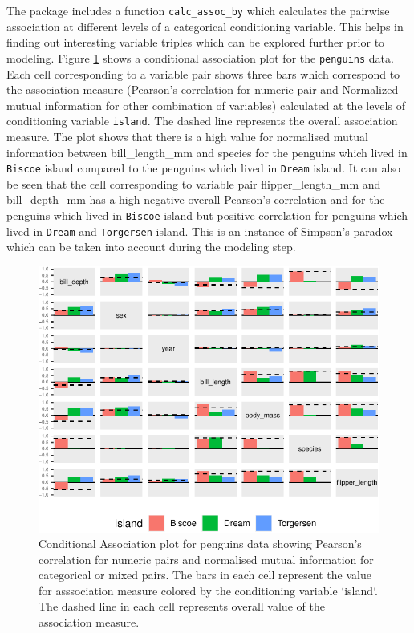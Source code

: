 The package includes a function \texttt{calc\_assoc\_by} which
calculates the pairwise association at different levels of a categorical
conditioning variable. This helps in finding out interesting variable
triples which can be explored further prior to modeling. Figure
\ref{fig:cond-assoc} shows a conditional association plot for the
\texttt{penguins} data. Each cell corresponding to a variable pair shows
three bars which correspond to the association measure (Pearson's
correlation for numeric pair and Normalized mutual information for other
combination of variables) calculated at the levels of conditioning
variable \texttt{island}. The dashed line represents the overall
association measure. The plot shows that there is a high value for
normalised mutual information between bill\_length\_mm and species for
the penguins which lived in \texttt{Biscoe} island compared to the
penguins which lived in \texttt{Dream} island. It can also be seen that
the cell corresponding to variable pair flipper\_length\_mm and
bill\_depth\_mm has a high negative overall Pearson's correlation and
for the penguins which lived in \texttt{Biscoe} island but positive
correlation for penguins which lived in \texttt{Dream} and
\texttt{Torgersen} island. This is an instance of Simpson's paradox
which can be taken into account during the modeling step.

\begin{Schunk}
\begin{figure}

{\centering \includegraphics{rj_paper_files/figure-latex/cond-assoc-1} 

}

\caption[Conditional Association plot for penguins data showing Pearson's correlation for numeric pairs and normalised mutual information for categorical or mixed pairs]{Conditional Association plot for penguins data showing Pearson's correlation for numeric pairs and normalised mutual information for categorical or mixed pairs. The bars in each cell represent the value for asssociation measure colored by the conditioning variable `island`. The dashed line in each cell represents overall value of the association measure.}\label{fig:cond-assoc}
\end{figure}
\end{Schunk}

